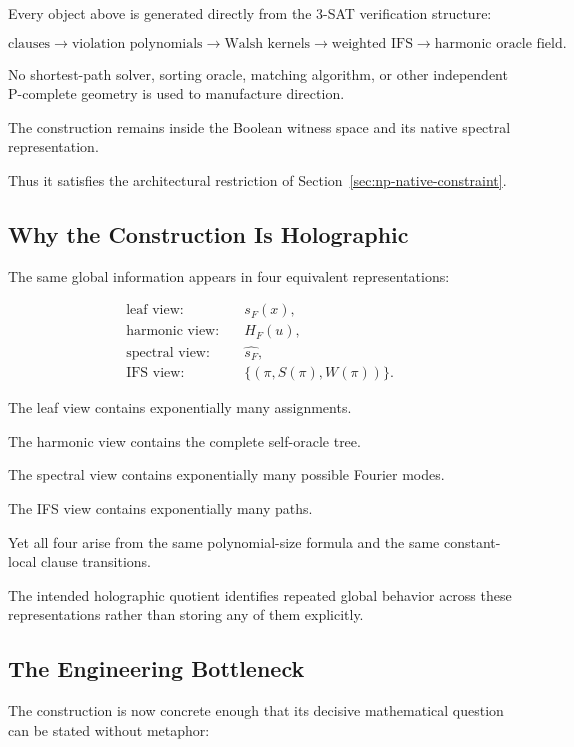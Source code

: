 \documentclass[11pt]{article}
\theoremstyle{plain}
\theoremstyle{definition}
\begin{document}
Every object above is generated directly from the 3-SAT verification
structure:

\[
    \text{clauses}
    \to
    \text{violation polynomials}
    \to
    \text{Walsh kernels}
    \to
    \text{weighted IFS}
    \to
    \text{harmonic oracle field}.
\]

No shortest-path solver, sorting oracle, matching algorithm, or other
independent P-complete geometry is used to manufacture direction.

The construction remains inside the Boolean witness space and its native
spectral representation.

Thus it satisfies the architectural restriction of
Section~\ref{sec:np-native-constraint}.

\subsection{Why the Construction Is Holographic}

The same global information appears in four equivalent representations:

\[
\boxed{
\begin{aligned}
\text{leaf view:}
&\quad
s_F(x),
\\[3pt]
\text{harmonic view:}
&\quad
H_F(u),
\\[3pt]
\text{spectral view:}
&\quad
\widehat{s_F},
\\[3pt]
\text{IFS view:}
&\quad
\{(\pi,S(\pi),W(\pi))\}.
\end{aligned}
}
\]

The leaf view contains exponentially many assignments.

The harmonic view contains the complete self-oracle tree.

The spectral view contains exponentially many possible Fourier modes.

The IFS view contains exponentially many paths.

Yet all four arise from the same polynomial-size formula and the same
constant-local clause transitions.

The intended holographic quotient identifies repeated global behavior across
these representations rather than storing any of them explicitly.

\subsection{The Engineering Bottleneck}

The construction is now concrete enough that its decisive mathematical
question can be stated without metaphor:
\end{document}
